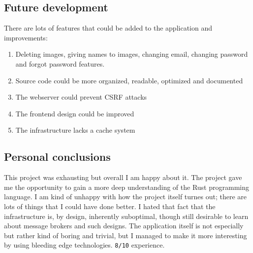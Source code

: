 \documentclass[../documentation.tex]{subfiles}
\begin{document}
\subsection{Future development}

There are lots of features that could be added to the application and improvements:
\begin{enumerate}
    \item Deleting images, giving names to images, changing email,
        changing password and forgot password features.
    \item Source code could be more organized, readable, optimized and documented
    \item The webserver could prevent CSRF attacks
    \item The frontend design could be improved
    \item The infrastructure lacks a cache system
\end{enumerate}

\subsection{Personal conclusions}

This project was exhausting but overall I am happy about it.
The project gave me the opportunity to gain a more deep
understanding of the Rust programming language. I am kind of unhappy
with how the project itself turnes out; there are lots of things
that I could have done better. I hated that fact that
the infrastructure is, by design, inherently suboptimal,
though still desirable to learn about message brokers and such designs.
The application itself is not especially 
but rather kind of boring and trivial, but I managed
to make it more interesting by using bleeding edge technologies.
\texttt{8/10} experience.
\end{document}
